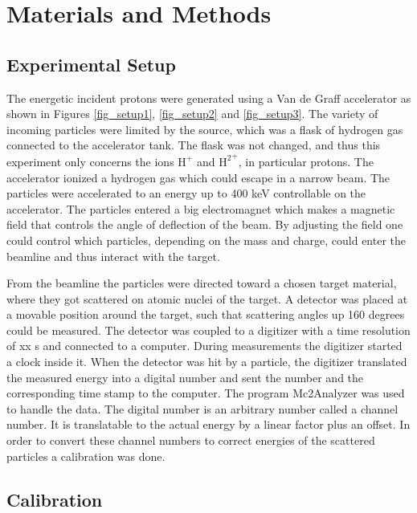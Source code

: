 \section{Materials and Methods}
\subsection{Experimental Setup}
The energetic incident protons were generated using a Van de Graff accelerator as shown in Figures \ref{fig_setup1}, \ref{fig_setup2} and \ref{fig_setup3}. The variety of incoming particles were limited by the source, which was a flask of hydrogen gas connected to the accelerator tank. The flask was not changed, and thus this experiment only concerns the ions $\mathrm{H^+}$ and $\mathrm{{H^2}^+}$, in particular protons. The accelerator ionized a hydrogen gas which could escape in a narrow beam. The particles were accelerated to an energy up to 400 keV controllable on the accelerator. The particles entered a big electromagnet which makes a magnetic field that controls the angle of deflection of the beam. By adjusting the field one could control which particles, depending on the mass and charge, could enter the beamline and thus interact with the target. 

From the beamline the particles were directed toward a chosen target material, where they got scattered on atomic nuclei of the target. A detector was placed at a movable position around the target, such that scattering angles up 160 degrees could be measured. 
The detector was coupled to a digitizer with a time resolution of xx s and  connected to a computer. During measurements the digitizer started a clock inside it. When the detector was hit by a particle, the digitizer translated the measured energy into a digital number and sent the number and the corresponding time stamp to the computer. 
The program Mc2Analyzer was used to handle the data. The digital number is an arbitrary number called a channel number. It is translatable to the actual energy by a linear factor plus an offset. In order to convert these channel numbers to correct energies of the scattered particles a calibration was done.


\subsection{Calibration}

